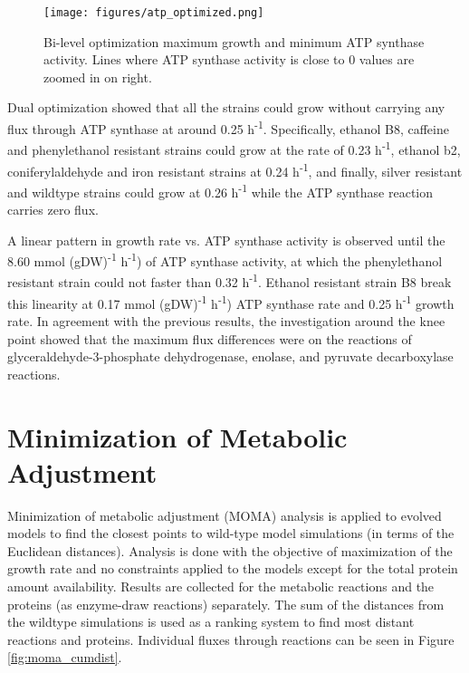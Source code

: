\begin{figure}[H]
  \begin{center}
  \texttt{[image: figures/atp\_optimized.png]}
  \caption[Bi-level optimization maximum growth and minimum ATP synthase activity. Lines where ATP synthase activity is close to 0 values are zoomed in on right.]{Bi-level optimization maximum growth and minimum ATP synthase activity. Lines where ATP synthase activity is close to 0 values are zoomed in on right.}
  \label{fig:bi_level1}
  \end{center}
\end{figure}

Dual optimization showed that all the strains could grow without carrying any flux through ATP synthase at around 0.25 h\textsuperscript{-1}. Specifically, ethanol B8,
caffeine and phenylethanol resistant strains could grow at the rate of  0.23 h\textsuperscript{-1}, ethanol b2, coniferylaldehyde and iron resistant strains at 0.24 h\textsuperscript{-1}, and finally, silver resistant and wildtype strains could grow at  0.26 h\textsuperscript{-1} while the ATP synthase reaction carries zero flux.

A linear pattern in growth rate vs. ATP synthase activity is observed until the 8.60 mmol (gDW)\textsuperscript{-1} h\textsuperscript{-1}) of ATP synthase activity, at which the phenylethanol resistant strain could not faster than 0.32 h\textsuperscript{-1}. Ethanol resistant strain B8 break this linearity at 0.17  mmol (gDW)\textsuperscript{-1} h\textsuperscript{-1}) ATP synthase rate and 0.25 h\textsuperscript{-1} growth rate. In agreement with the previous results, the investigation around the knee point showed that the maximum flux differences were on the reactions of glyceraldehyde-3-phosphate dehydrogenase, enolase, and pyruvate decarboxylase reactions.

\section{Minimization of Metabolic Adjustment}

Minimization of metabolic adjustment (MOMA) analysis is applied to evolved models to find the closest points to wild-type model simulations (in terms of the Euclidean distances). Analysis is done with the objective of maximization of the growth rate and no constraints applied to the models except for the total protein amount availability. Results are collected for the metabolic reactions and the proteins (as enzyme-draw reactions) separately. The sum of the distances from the wildtype simulations is used as a ranking system to find most distant reactions and proteins. Individual fluxes through reactions can be seen in Figure \ref{fig:moma_cumdist}.

